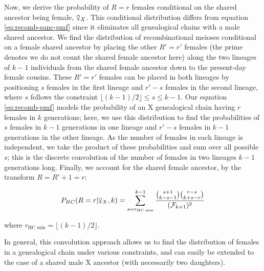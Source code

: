 \documentclass[9pt,twocolumn,twoside]{gsajnl}
\newcommand{\fsxa}{\venus_X}
\begin{document}
Now, we derive the probability of $R=r$ females conditional on the shared
ancestor being female, $\fsxa$. This conditional distribution differs from
equation \eqref{eq:recomb-sanc-pmf} since it eliminates all genealogical chains
with a male shared ancestor. We find the distribution of recombinational
meioses conditional on a female shared ancestor by placing the other $R'=r'$
females (the prime denotes we do not count the shared female ancestor here)
along the two lineages of $k-1$ individuals from the shared female ancestor
down to the present-day female cousins. These $R'=r'$ females can be placed in
both lineages by positioning $s$ females in the first lineage and $r'-s$
females in the second lineage, where $s$ follows the constraint $\lfloor
(k-1)/2 \rfloor \le s \le k-1$.  Our equation \eqref{eq:recomb-pmf} models the
probability of an X genealogical chain having $r$ females in $k$ generations;
here, we use this distribution to find the probabilities of $s$ females in
$k-1$ generations in one lineage and $r'-s$ females in $k-1$ generations in the
other lineage. As the number of females in each lineage is independent, we take
the product of these probabilities and sum over all possible $s$; this is the
discrete convolution of the number of females in two lineages $k-1$ generations
long.  Finally, we account for the shared female ancestor, by the transform $R
= R' + 1 = r$:

\begin{equation}
  \label{eq:prob-r-given-female}
  P_{HC}(R=r | \fsxa, k) = \sum_{s=r_\text{HC min}}^{k-1} \frac{ {s + 1 \choose k - s - 1 } { r - s \choose k + s - r } }{(\mathcal{F}_{k+1})^2}
\end{equation}

where $r_\text{HC min} = \lfloor (k-1)/2 \rfloor$.

In general, this convolution approach allows us to find the distribution of
females in a genealogical chain under various constraints, and can easily be
extended to the case of a shared male X ancestor (with necessarily two
daughters).
 
\end{document}

